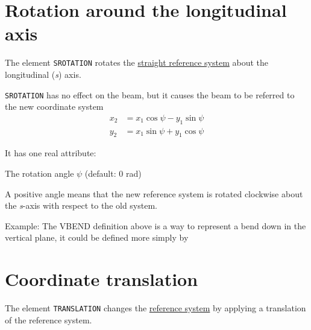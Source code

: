\section{Rotation around the longitudinal axis}
\label{sec:srotation}

The element \texttt{SROTATION} rotates the
\hyperref[subsec:local-straight]{straight reference system} about the
longitudinal (\textit{s}) axis. 


\texttt{SROTATION} has no effect on the beam, but it causes the beam to be 
referred to the new coordinate system \\ 
\begin{equation}\begin{split}
x_2 &= x_1 \cos\psi - y_1 \sin\psi \\
y_2 &= x_1 \sin\psi + y_1 \cos\psi
\end{split}\end{equation}


It has one real attribute: 
\begin{madlist}
    The rotation angle $\psi$ (default: 0 rad) 
\end{madlist}

A positive angle means that the new reference system is rotated
clockwise about the \textit{s}-axis with respect to the old system.  

Example: 
The VBEND definition above is a way to represent a bend down in the
vertical plane, it could be defined more simply by  

\section{Coordinate translation}
\label{sec:translation}

The element \texttt{TRANSLATION} changes the
\hyperref[subsec:local-straight]{reference system} 
by applying a translation of the reference system.

